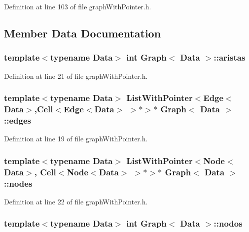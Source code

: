 Definition at line 103 of file graph\+With\+Pointer.\+h.



\subsection{Member Data Documentation}
\hypertarget{class_graph_a4aeb20da059673dd103faf1499e59118}{
\subsubsection[{aristas}]{\setlength{\rightskip}{0pt plus 5cm}template$<$typename Data$>$ int {\bf Graph}$<$ {\bf Data} $>$\+::aristas}}\label{class_graph_a4aeb20da059673dd103faf1499e59118}


Definition at line 21 of file graph\+With\+Pointer.\+h.

\hypertarget{class_graph_a973cbdbbf60ccf30f4c77bba47f3e962}{
\subsubsection[{edges}]{\setlength{\rightskip}{0pt plus 5cm}template$<$typename Data$>$ {\bf List\+With\+Pointer}$<${\bf Edge}$<${\bf Data}$>$,{\bf Cell}$<${\bf Edge}$<${\bf Data}$>$ $>$$\ast$$>$$\ast$ {\bf Graph}$<$ {\bf Data} $>$\+::edges}}\label{class_graph_a973cbdbbf60ccf30f4c77bba47f3e962}


Definition at line 19 of file graph\+With\+Pointer.\+h.

\hypertarget{class_graph_a07d8653e4d8d908c57d3977212797f3b}{
\subsubsection[{nodes}]{\setlength{\rightskip}{0pt plus 5cm}template$<$typename Data$>$ {\bf List\+With\+Pointer}$<${\bf Node}$<${\bf Data}$>$, {\bf Cell}$<${\bf Node}$<${\bf Data}$>$ $>$$\ast$$>$$\ast$ {\bf Graph}$<$ {\bf Data} $>$\+::nodes}}\label{class_graph_a07d8653e4d8d908c57d3977212797f3b}


Definition at line 22 of file graph\+With\+Pointer.\+h.

\hypertarget{class_graph_a5b930a12715664a8a1595623ec5b55f3}{
\subsubsection[{nodos}]{\setlength{\rightskip}{0pt plus 5cm}template$<$typename Data$>$ int {\bf Graph}$<$ {\bf Data} $>$\+::nodos}}\label{class_graph_a5b930a12715664a8a1595623ec5b55f3}



